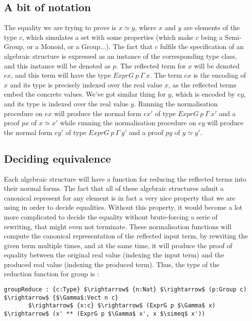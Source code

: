 	\subsection {A bit of notation}
The equality we are trying to prove is $x \simeq y$, where $x$ and $y$ are elements of the type $c$, which  simulates a set with some properties (which make $c$ being a Semi-Group, or a Monoid, or a Group...). The fact that $c$ fulfils the specification of an algebraic structure is expressed as an instance of the corresponding type class, and this instance will be denoted as $p$.
The reflected term for $x$ will be denoted $ex$, and this term will have the type $ExprG\ p\ \Gamma\ x$. The term $ex$ is the encoding of $x$ and its type is precisely indexed over the real value $x$, as the reflected terms embed the concrete values.
We've got similar thing for $y$, which is encoded by $ey$, and its type is indexed over the real value $y$.
Running the normalisation procedure on $ex$ will produce the normal form $ex'$ of type $ExprG\ p\ \Gamma\ x'$ and a proof $px$ of $x \simeq x'$ while running the normalisation procedure on $ey$ will produce the normal form $ey'$ of type $ExprG\ p\ \Gamma\ y'$ and a proof $py$ of $y \simeq y'$.

	\subsection {Deciding equivalence}
	
Each algebraic structure will have a function for reducing the reflected terms into their normal forms. The fact that all of these algebraic structures admit a canonical represent for any element is in fact a very nice property that we are using in order to decide equalities. Without this property, it would become a lot more complicated to decide the equality without brute-forcing a serie of rewriting, that might even not terminate.
These normalisation functions will compute the canonical representation of the reflected input term, by rewriting the given term multiple times, and at the same time, it will produce the proof of equality between the original real value (indexing the input term) and the produced real value (indexing the produced term). Thus, the type of the reduction function for group is :


\begin{lstlisting}
groupReduce : {c:Type} $\rightarrow$ {n:Nat} $\rightarrow$ (p:Group c) $\rightarrow$ {$\Gamma$:Vect n c} 
	   $\rightarrow$ {x:c} $\rightarrow$ (ExprG p $\Gamma$ x) $\rightarrow$ (x' ** (ExprG p $\Gamma$ x', x $\simeq$ x'))
\end{lstlisting}


